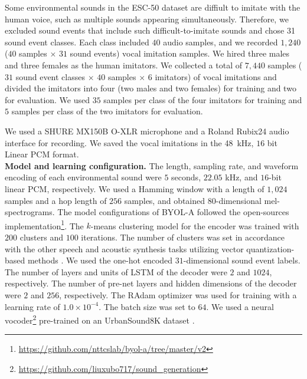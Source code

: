 \documentclass{article}
\begin{document}
Some environmental sounds in the ESC-50 dataset are diffiult to imitate with the human voice, such as multiple sounds appearing simultaneously. 
Therefore, we excluded sound events that include such difficult-to-imitate sounds and chose 31 sound event classes.
Each class included  $40$ audio samples, and we recorded $1,240$ ($40$ samples $\times$ $31$ sound events) vocal imitation samples. 
We hired three males and three females as the human imitators.
We collected a total of $7,440$ samples ($31$ sound event classes $\times$ $40$ samples $\times$ $6$ imitators)  of vocal imitations and divided the imitators into four (two males and two females) for training and two for evaluation.
We used $35$ samples per class of the four imitators for training and $5$ samples per class of the two imitators for evaluation.

We used a SHURE MX150B O-XLR microphone and a Roland Rubix24 audio interface for recording.
We saved the vocal imitations in the \SI{48}{kHz}, $16$ bit Linear PCM format.
\\\textbf{Model and learning configuration.}
The length, sampling rate, and waveform encoding of each environmental sound were $5$ seconds, $22.05$ kHz, and $16$-bit linear PCM, respectively.
We used a Hamming window with a length of $1,024$ samples and a hop length of $256$ samples, and obtained $80$-dimensional mel-spectrograms.
The model configurations of BYOL-A followed the open-sources implementation\footnote{\scriptsize{\url{https://github.com/nttcslab/byol-a/tree/master/v2}}}.
The $k$-means clustering model for the encoder was trained with $200$ clusters and $100$ iterations.
The number of clusters was set in accordance with the other speech and acoustic synthesis tasks utilizing vector quantization-based methods \cite{Lakhotia_TACL_2021}.
We used the one-hot encoded $31$-dimensional sound event labels.
The number of layers and units of LSTM of the decoder were $2$ and $1024$, respectively.
The number of pre-net layers and hidden dimensions of the decoder were $2$ and $256$, respectively.
The RAdam \cite{Liu_ICLR_2020} optimizer was used for training with a learning rate of $1.0 \times 10^{-4}$.
The batch size was set to $64$.
We used a neural vocoder\footnote{\scriptsize{\url{https://github.com/liuxubo717/sound_generation}}} pre-trained on an UrbanSound8K dataset \cite{Salamon_ACM-MM_2014}.
%
\vspace{-3pt}
\end{document}
